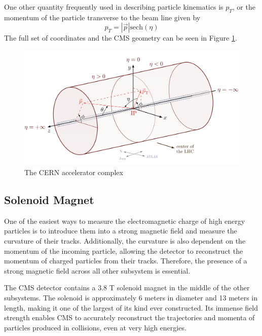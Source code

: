 One other quantity frequently used in describing particle kinematics is $p_T$, or the momentum of the particle transverse to the beam line given by
\begin{equation}
    p_T = |\vec{p}|\text{sech}(\eta)
\end{equation}
The full set of coordinates and the CMS geometry can be seen in Figure \ref{fig:cms-coordinate-system}.

\begin{figure}[hb!]
    \centering
    \includegraphics[width=1.0\textwidth]{figures/chapter3/CMS-coordinate-system.png}
    \caption{The CERN accelerator complex}
    \label{fig:cms-coordinate-system}
\end{figure}



\subsection{Solenoid Magnet}

One of the easiest ways to measure the electromagnetic charge of high energy particles is to introduce them into a strong magnetic field and measure the curvature of their tracks. Additionally, the curvature is also dependent on the momentum of the incoming particle, allowing the detector to reconstruct the momentum of charged particles from their tracks. Therefore, the presence of a strong magnetic field across all other subsystem is essential. 

The CMS detector contains a 3.8 T solenoid magnet in the middle of the other subsystems. The solenoid is approximately 6 meters in diameter and 13 meters in length, making it one of the largest of its kind ever constructed. Its immense field strength enables CMS to accurately reconstruct the trajectories and momenta of particles produced in collisions, even at very high energies.

